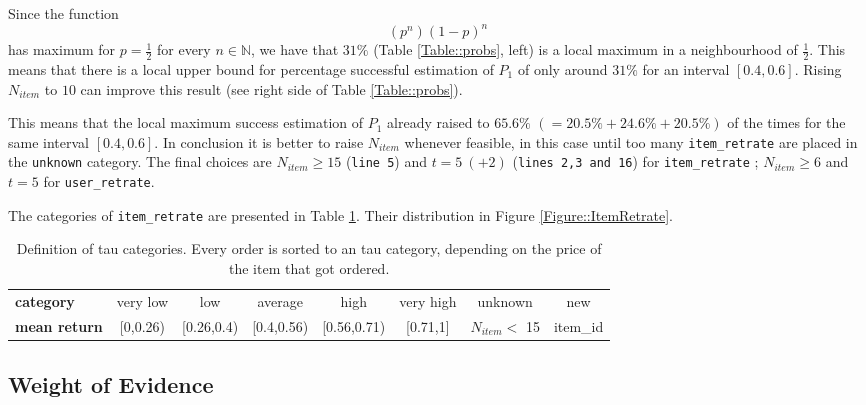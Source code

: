 \documentclass[a4paper,12pt]{article}
\begin{document}
Since the function $$(p^n)(1-p)^n$$ has maximum for $p=\frac{1}{2}$ for every $n \in \mathbb{N}$, we have that $31\%$ (Table \ref{Table::probs}, left) is a local maximum in a neighbourhood of $\frac{1}{2}$.
This means that there is a local upper bound for percentage successful estimation of $P_1$ of only around $31\%$ for an interval $[0.4,0.6]$.
Rising $N_{item}$ to $10$ can improve this result (see right side of Table \ref{Table::probs}).

This means that the local maximum success estimation of $P_1$ already raised to $65.6 \%$ $( = 20.5\% + 24.6\% + 20.5\%)$ of the times for the same interval $[0.4,0.6]$.
\newline
In conclusion it is better to raise $N_{item}$ whenever feasible, in this case until too many \texttt{item\_retrate} are placed in the \texttt{unknown} category.
The final choices are $N_{item} \geq 15$ (\texttt{line 5}) and $t =5 \ (+2)$ (\texttt{lines 2,3 and 16}) for \texttt{item\_retrate} ; $N_{item} \geq 6$ and $t =5$ for \texttt{user\_retrate}. 

The categories of \texttt{item\_retrate} are presented in Table \ref{Table::intervals}. Their distribution in Figure \ref{Figure::ItemRetrate}.
\begin{center}
\begin{table}[h]
\begin{tabular}{|l|| c | c | c | c | c | c | c |}
\hline
\textbf{category} & very low & low & average & high & very high & unknown & new \\
\textbf{mean return}  & {[}0,0.26)   & {[}0.26,0.4)   & {[}0.4,0.56)  & {[}0.56,0.71)   & {[}0.71,1{]}    & $N_{item} <$  15 &  item\_id \\
\hline     
\end{tabular}
 \caption{Definition of tau categories. Every order is sorted to an tau category, depending on the price of the item that got ordered.}
 \label{Table::intervals}
\end{table}
\end{center}

\subsection{Weight of Evidence}\label{Subsec::WOE}
\end{document}
